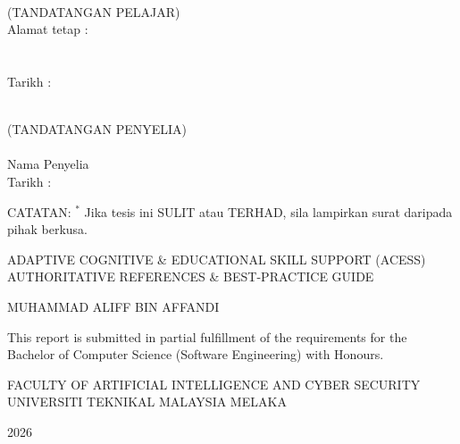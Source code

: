 \documentclass[12pt, oneside]{article} %
\begin{document}
\vspace{5mm}
\noindent
\begin{minipage}[t]{0.5\textwidth}
\centering
\underline{\hspace{6cm}} \\
(TANDATANGAN PELAJAR) \\[4mm]
Alamat tetap : \underline{} \\
\underline{} \\
\underline{} \\[4mm]
Tarikh : \underline{}
\end{minipage}%
\begin{minipage}[t]{0.5\textwidth}
\centering
\underline{\hspace{6cm}} \\
(TANDATANGAN PENYELIA) \\[4mm]
\underline{} \\
Nama Penyelia \\[8mm]
Tarikh : \underline{\hspace{4.5cm}}
\end{minipage}

\vspace{3mm}
\noindent
CATATAN: \; $^{\ast}$ Jika tesis ini SULIT atau TERHAD, sila lampirkan surat daripada pihak berkusa.

\restoregeometry
{}
\setlength{\parskip}{1.3em}


\setcounter{page}{1}
\justifying




\begin{center}

\vfill \null
\vspace{1cm}
{ADAPTIVE COGNITIVE \& EDUCATIONAL SKILL SUPPORT (ACESS) \\
AUTHORITATIVE REFERENCES \& BEST-PRACTICE GUIDE}

\vskip 1.6in
{MUHAMMAD ALIFF BIN AFFANDI}

\vskip 1.6in
This report is submitted in partial fulfillment of the requirements for the \\
Bachelor of Computer Science (Software Engineering) with Honours.


\vskip 1.6in
FACULTY OF ARTIFICIAL INTELLIGENCE AND CYBER SECURITY \\
UNIVERSITI TEKNIKAL MALAYSIA MELAKA

\vspace{2mm}
2026


\end{center}
\end{document}
